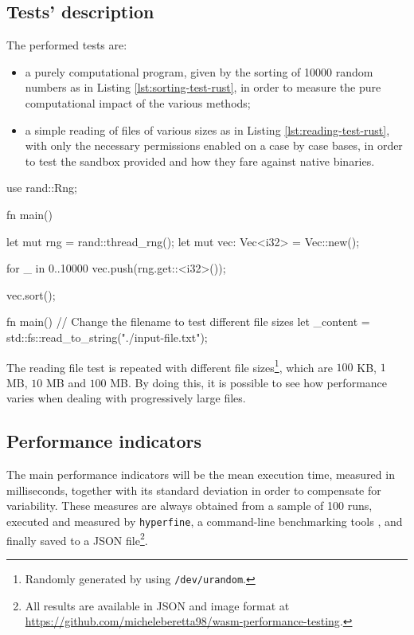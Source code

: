 \subsection{Tests' description}

The performed tests are:
\begin{itemize}
  \item a purely computational program, given by the sorting of 10000 random numbers as in Listing \ref{lst:sorting-test-rust},
        in order to measure the pure computational impact of the various methods;
  \item a simple reading of files of various sizes as in Listing \ref{lst:reading-test-rust}, with only the necessary permissions enabled on
        a case by case bases, in order to test the sandbox provided and how they fare against native binaries.
\end{itemize}

\vspace*{0.5cm}
\begin{code}[language=Rust, caption=The tested sorting program., label=lst:sorting-test-rust]
use rand::Rng;

fn main() {
  let mut rng = rand::thread_rng();
  let mut vec: Vec<i32> = Vec::new();

  for _ in 0..10000 {
    vec.push(rng.get::<i32>());
  }

  vec.sort();
}
\end{code}

\begin{code}[language=Rust, caption=The tested reading program., label=lst:reading-test-rust]
fn main() {
  // Change the filename to test different file sizes
  let _content =
    std::fs::read_to_string("./input-file.txt");
}
\end{code}

The reading file test is repeated with different file sizes\footnote{Randomly generated by using \texttt{/dev/urandom}.},
which are $100$ KB, $1$ MB, $10$ MB and $100$ MB. By doing this, it is possible to see how performance
varies when dealing with progressively large files.

\subsection{Performance indicators}

The main performance indicators will be the mean execution time, measured in milliseconds, together with its
standard deviation in order to compensate for variability.
These measures are always obtained from a sample of 100 runs, executed and measured by \texttt{hyperfine},
a command-line benchmarking tools \cite{hyperfine}, and finally saved to a
JSON file\footnote{All results are available in JSON and image format at \url{https://github.com/micheleberetta98/wasm-performance-testing}.}.

